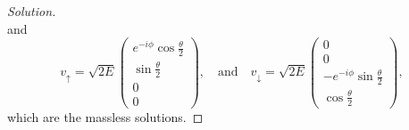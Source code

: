 \begin{proof}[Solution]
\begin{equation*}
   \end{equation*}
   and
   \begin{equation*}
      v_{\uparrow} =\sqrt{2E}{\begin{pmatrix}
            e^{-i\phi} \cos\frac\theta2\\
            \sin\frac\theta2\\
            0\\
            0
      \end{pmatrix}},\quad\text{and}\quad
      v_{\downarrow} = \sqrt{2E}{\begin{pmatrix}
            0\\
            0\\
            -e^{-i\phi} \sin\frac\theta2\\
            \cos\frac\theta2
      \end{pmatrix}},
   \end{equation*}
   which are the massless solutions.
\end{proof}
